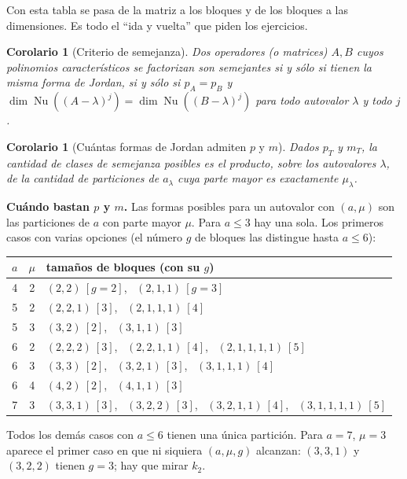 \documentclass{article}
\DeclareMathOperator{\Nu}{Nu}
\theoremstyle{plain}
\newtheorem{corolario}[teorema]{Corolario}
\theoremstyle{definition}
\theoremstyle{remark}
\begin{document}
Con esta tabla se pasa de la matriz a los bloques y de los bloques a las dimensiones. Es todo el ``ida y vuelta'' que piden los ejercicios.

\begin{corolario}[Criterio de semejanza]\label{cor:semej}
    Dos operadores (o matrices) \(A,B\) cuyos polinomios característicos se factorizan son semejantes si y sólo si tienen la misma forma de Jordan, si y sólo si \(p_A=p_B\) y \(\dim\Nu((A-\lambda)^j)=\dim\Nu((B-\lambda)^j)\) para todo autovalor \(\lambda\) y todo \(j\).
\end{corolario}

\begin{corolario}[Cuántas formas de Jordan admiten \(p\) y \(m\)]\label{cor:cuantas}
    Dados \(p_T\) y \(m_T\), la cantidad de clases de semejanza posibles es el producto, sobre los autovalores \(\lambda\), de la cantidad de particiones de \(a_\lambda\) cuya parte mayor es exactamente \(\mu_\lambda\).
\end{corolario}

\textbf{Cuándo bastan \(p\) y \(m\).} Las formas posibles para un autovalor con \((a,\mu)\) son las particiones de \(a\) con parte mayor \(\mu\). Para \(a\le3\) hay una sola. Los primeros casos con varias opciones (el número \(g\) de bloques las distingue hasta \(a\le6\)):

\begin{center}
    \renewcommand{\arraystretch}{1.25}
    \begin{tabular}{@{}ccl@{}}
        \toprule
        \(a\) & \(\mu\) & tamaños de bloques (con su \(g\))                                                  \\
        \midrule
        4     & 2       & \((2,2)\ [g=2]\), \ \((2,1,1)\ [g=3]\)                                             \\
        5     & 2       & \((2,2,1)\ [3]\), \ \((2,1,1,1)\ [4]\)                                             \\
        5     & 3       & \((3,2)\ [2]\), \ \((3,1,1)\ [3]\)                                                 \\
        6     & 2       & \((2,2,2)\ [3]\), \ \((2,2,1,1)\ [4]\), \ \((2,1,1,1,1)\ [5]\)                     \\
        6     & 3       & \((3,3)\ [2]\), \ \((3,2,1)\ [3]\), \ \((3,1,1,1)\ [4]\)                           \\
        6     & 4       & \((4,2)\ [2]\), \ \((4,1,1)\ [3]\)                                                 \\
        7     & 3       & \((3,3,1)\ [3]\), \ \((3,2,2)\ [3]\), \ \((3,2,1,1)\ [4]\), \ \((3,1,1,1,1)\ [5]\) \\
        \bottomrule
    \end{tabular}
\end{center}
Todos los demás casos con \(a\le6\) tienen una única partición. Para \(a=7\), \(\mu=3\) aparece el primer caso en que ni siquiera \((a,\mu,g)\) alcanzan: \((3,3,1)\) y \((3,2,2)\) tienen \(g=3\); hay que mirar \(k_2\).
\end{document}
